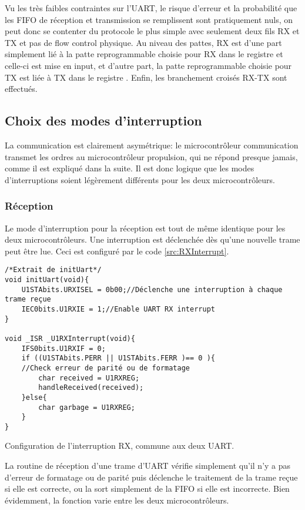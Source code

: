 Vu les très faibles contraintes sur l'UART, le risque d'erreur et la probabilité que les FIFO de réception et transmission se remplissent sont pratiquement nuls, on peut donc se contenter du protocole le plus simple avec seulement deux fils RX et TX et pas de flow control physique. Au niveau des pattes, RX est d'une part simplement lié à la patte reprogrammable choisie pour RX dans le registre  et celle-ci est mise en input, et d'autre part, la patte reprogrammable choisie pour TX est liée à TX dans le registre . Enfin, les branchement croisés RX-TX sont effectués.

\subsection{Choix des modes d'interruption}
La communication est clairement asymétrique: le microcontrôleur communication transmet les ordres au microcontrôleur propulsion, qui ne répond presque jamais, comme il est expliqué dans la suite. Il est donc logique que les modes d'interruptions soient légèrement différents pour les deux microcontrôleurs.

\subsubsection{Réception}
Le mode d'interruption pour la réception est tout de même identique pour les deux microcontrôleurs. Une interruption est déclenchée dès qu'une nouvelle trame peut être lue. Ceci est configuré par le code \ref{src:RXInterrupt}.
\begin{listing}[htbp]
\begin{verbatim}
/*Extrait de initUart*/
void initUart(void){
    U1STAbits.URXISEL = 0b00;//Déclenche une interruption à chaque trame reçue
    IEC0bits.U1RXIE = 1;//Enable UART RX interrupt
}

void _ISR _U1RXInterrupt(void){
    IFS0bits.U1RXIF = 0;
    if ((U1STAbits.PERR || U1STAbits.FERR )== 0 ){
    //Check erreur de parité ou de formatage
        char received = U1RXREG;
        handleReceived(received);
    }else{
        char garbage = U1RXREG;
    }
}
\end{verbatim}
\caption{Configuration de l'interruption RX, commune aux deux UART.\label{src:RXInterrupt}}
\end{listing}

La routine de réception d'une trame d'UART vérifie simplement qu'il n'y a pas d'erreur de formatage ou de parité puis déclenche le traitement de la trame reçue si elle est correcte, ou la sort simplement de la FIFO si elle est incorrecte. Bien évidemment, la fonction  varie entre les deux microcontrôleurs.

